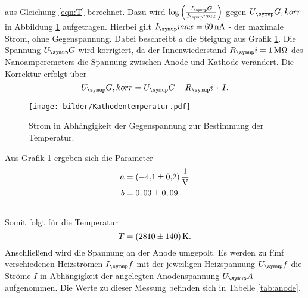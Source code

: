 aus Gleichung \eqref{eqn:T} berechnet.
Dazu wird $\log{\left(\frac{I_\su{G}}{I_\su{max}}\right)}$ gegen $U_\su{G,korr}$ in Abbildung \ref{fig:g} aufgetragen.
Hierbei gilt $I_\su{max} = \SI{69}{\nano\ampere}$ - der maximale Strom, ohne Gegenspannung. Dabei beschreibt
$a$ die Steigung aus Grafik \ref{fig:g}.
Die Spannung $U_\su{G}$ wird korrigiert, da der Innenwiederstand
$R_\su{i} = \SI{1}{\mega\ohm}$ des Nanoamperemeters die Spannung zwischen
Anode und Kathode verändert. Die Korrektur erfolgt über
\begin{equation}
  U_\su{G,korr} = U_\su{G}-R_\su{i}\,\cdot\, I. \\
\end{equation}
\begin{figure}[H]
  \centering
  \texttt{[image: bilder/Kathodentemperatur.pdf]}
  \caption{Strom in Abhängigkeit der Gegenspannung zur Bestimmung der Temperatur.}
  \label{fig:g}
\end{figure}
Aus Grafik \ref{fig:g} ergeben sich die Parameter
\begin{align}
  a &= \SI[per-mode=fraction]{-4,1\pm0,2}{\per\volt}\\ \notag
  b &= 0,03\pm0,09.\\ \notag
\end{align}
Somit folgt für die Temperatur
\begin{equation}
  T = \SI{2810\pm140}{\kelvin}. \notag
\end{equation}
Anschließend wird die Spannung an der Anode umgepolt. Es werden zu fünf verschiedenen
Heizströmen $I_\su{f}$ mit der jeweiligen Heizspannung $U_\su{f}$ die Ströme $I$
in Abhängigkeit der angelegten Anodenspannung $U_\su{A}$ aufgenommen.
Die Werte zu dieser Messung befinden sich in Tabelle \ref{tab:anode}.
